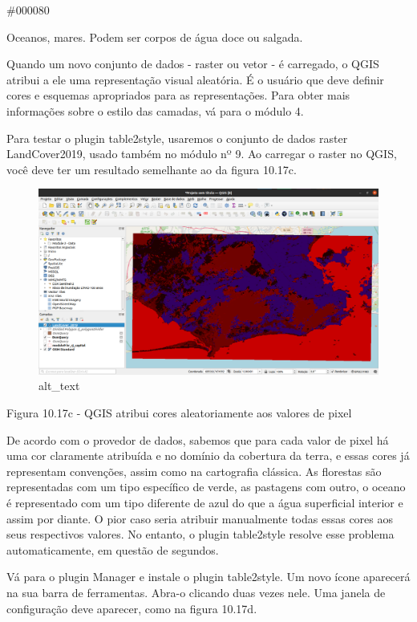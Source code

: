 \documentclass[
]{book}
\begin{document}
\#000080

Oceanos, mares. Podem ser corpos de água doce ou salgada.

Quando um novo conjunto de dados - raster ou vetor - é carregado, o QGIS atribui a ele uma representação visual aleatória. É o usuário que deve definir cores e esquemas apropriados para as representações. Para obter mais informações sobre o estilo das camadas, vá para o módulo 4.

Para testar o plugin table2style, usaremos o conjunto de dados raster LandCover2019, usado também no módulo nº 9. Ao carregar o raster no QGIS, você deve ter um resultado semelhante ao da figura 10.17c.

\begin{figure}
\centering
\includegraphics{media/modulo10/fig1017_c.png}
\caption{alt\_text}
\end{figure}

Figura 10.17c - QGIS atribui cores aleatoriamente aos valores de pixel

De acordo com o provedor de dados, sabemos que para cada valor de pixel há uma cor claramente atribuída e no domínio da cobertura da terra, e essas cores já representam convenções, assim como na cartografia clássica. As florestas são representadas com um tipo específico de verde, as pastagens com outro, o oceano é representado com um tipo diferente de azul do que a água superficial interior e assim por diante. O pior caso seria atribuir manualmente todas essas cores aos seus respectivos valores. No entanto, o plugin table2style resolve esse problema automaticamente, em questão de segundos.

Vá para o plugin Manager e instale o plugin table2style. Um novo ícone aparecerá na sua barra de ferramentas. Abra-o clicando duas vezes nele. Uma janela de configuração deve aparecer, como na figura 10.17d.
\end{document}
